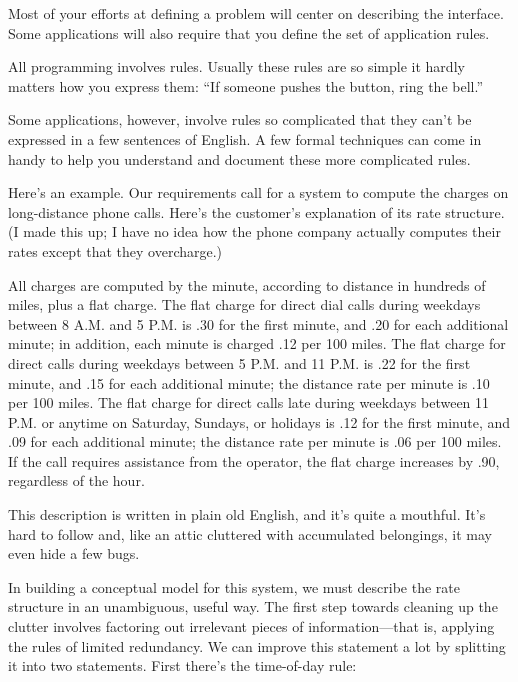 Most of your efforts at defining a problem will center on describing
the interface.%
Some applications will also require that you define the set of
application rules.

All programming involves rules. Usually these rules are so simple it
hardly matters how you express them: ``If someone pushes the button,
ring the bell.''

Some applications, however, involve rules so complicated that they
can't be expressed in a few sentences of English. A few formal techniques
can come in handy to help you understand and document these more
complicated rules.

Here's an example. Our requirements call for a system to compute the
charges on long-distance phone calls. Here's the customer's
explanation of its rate structure. (I made this up; I have no idea how
the phone company actually computes their rates except that they
overcharge.)

\begin{tfquot}
All charges are computed by the minute, according to distance in
hundreds of miles, plus a flat charge. The flat charge for direct dial
calls during weekdays between 8 A.M. and 5 P.M. is .30 for the first
minute, and .20 for each additional minute; in addition, each minute
is charged .12 per 100 miles. The flat charge for direct calls during
weekdays between 5 P.M. and 11 P.M. is .22 for the first minute, and
.15 for each additional minute; the distance rate per minute is .10
per 100 miles. The flat charge for direct calls late during weekdays
between 11 P.M. or anytime on Saturday, Sundays, or holidays is .12
for the first minute, and .09 for each additional minute; the distance
rate per minute is .06 per 100 miles. If the call requires assistance
from the operator, the flat charge increases by .90, regardless of the hour.
\end{tfquot}
This description is written in plain old English, and it's quite a
mouthful.  It's hard to follow and, like an attic cluttered with
accumulated belongings, it may even hide a few bugs.

In building a conceptual model for this system, we must describe the
rate structure in an unambiguous, useful way. The first step towards
cleaning up the clutter involves factoring out irrelevant pieces of
information---that is, applying the rules of limited redundancy. We
can improve this statement a lot by splitting it into two statements.
First there's the time-of-day rule:%

